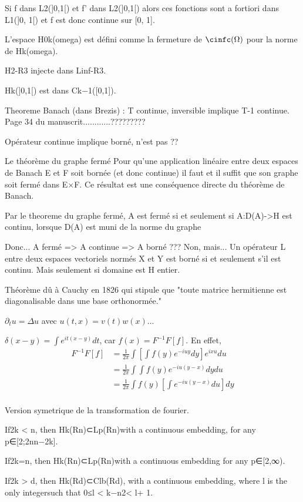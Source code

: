 Si f dans L2(]0,1[) et f' dans L2(]0,1[) alors ces fonctions sont a fortiori
dans L1(]0, 1[) et f est donc continue sur [0, 1].

L’espace H0k(omega) est défini comme la fermeture de $\cinfc(\Omega)$
pour la norme de Hk(omega).

H2-R3 injecte dans Linf-R3.

Hk(]0,1[) est dans Ck−1([0,1]).

Theoreme Banach (dans Brezis) : T continue, inversible implique T{-1} continue.
Page 34 du manuscrit............?????????

Opérateur continue implique borné, n'est pas ??

Le théorème du graphe fermé
Pour qu'une application linéaire entre deux espaces de Banach E et F
soit bornée (et donc continue) il faut et il suffit que son graphe soit
fermé dans E×F. Ce résultat est une conséquence directe du théorème de
Banach.

Par le theoreme du graphe fermé, A est fermé si et seulement si
A:D(A)->H est continu, lorsque D(A) est muni de la norme du graphe

Donc... A fermé => A continue => A borné ???
Non, mais... Un opérateur L entre deux espaces vectoriels normés X et Y
est borné si et seulement s'il est continu. Mais seulement si domaine
est H entier.

Théorème dû à Cauchy en 1826 qui stipule que "toute matrice hermitienne
est diagonalisable dans une base orthonormée."

$\partial_t u = \Delta u$ avec $u(t,x) = v(t)w(x)$...

$\delta(x - y) = \int e^{it(x-y)} dt$, car $f(x) = F^{-1} F [f]$. En effet,
\begin{align}
    F^{-1} F [f] &= \frac{1}{2\pi} \int \left[ \int f(y) e^{-iuy} dy \right] e^{ixu} du \\
    &= \frac{1}{2\pi} \int \int f(y) e^{-iu(y-x)} dy du \\
    &= \frac{1}{2\pi} \int f(y) \left[ \int e^{-iu(y-x)} du \right] dy \\
\end{align}

Version symetrique de la transformation de fourier.



If2k < n, then Hk(Rn)⊂Lp(Rn)with a continuous embedding, for any p∈[2;2nn−2k].

If2k=n, then Hk(Rn)⊂Lp(Rn)with a continuous embedding for any p∈[2,∞).

If2k > d, then Hk(Rd)⊂Clb(Rd), with a continuous embedding, where l is the only integersuch that 0≤l < k−n2< l+ 1.



